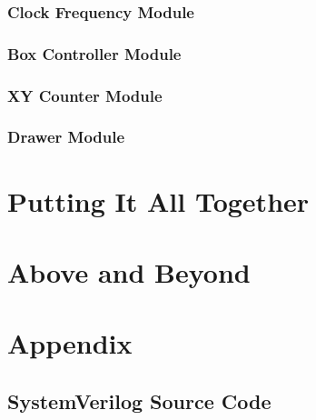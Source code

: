 \documentclass[12pt]{article}
\begin{document}
\subsubsection{Clock Frequency Module}

\subsubsection{Box Controller Module}

\subsubsection{XY Counter Module}

\subsubsection{Drawer Module}

\section{Putting It All Together}

\section{Above and Beyond}

\section{Appendix}

\subsection{SystemVerilog Source Code}
\end{document}
